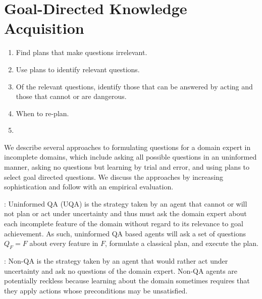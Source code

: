 \documentclass{article}
\def\und#1{\noindent{\bf #1}:}
\begin{document}
\section{Goal-Directed Knowledge Acquisition}

\begin{enumerate}
  \item Find plans that make questions irrelevant.
  \item Use plans to identify relevant questions.
  \item Of the relevant questions, identify those that can be answered by
  acting and those that cannot or are dangerous.
  \item When to re-plan.
  \item 
\end{enumerate}

We describe several approaches to formulating questions for a domain expert in
incomplete domains, which include asking all possible questions in an uninformed
manner, asking no questions but learning by trial and error, and using plans to
select goal directed questions. We discuss the approaches by increasing
sophistication and follow with an empirical evaluation.

\und{Uninformed QA} Uninformed QA (UQA) is the strategy taken by an agent that
cannot or will not plan or act under uncertainty and thus must ask the domain expert about each incomplete
feature of the domain without regard to its relevance to goal achievement.  As
such, uninformed QA based agents will ask a set of questions $Q_{F} = F$ about
every feature in $F$, formulate a classical plan, and execute the plan.

\und{Non-QA} Non-QA is the strategy taken by an agent that would rather act
under uncertainty and ask no questions of the domain expert.  Non-QA agents are
potentially reckless because learning about the domain sometimes requires that
they apply actions whose preconditions may be unsatisfied.  
\end{document}
